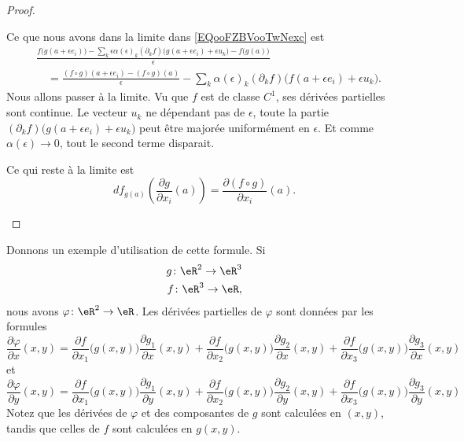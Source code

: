 \begin{proof}
\begin{subproof}
\begin{equation}
		\end{equation}
		Ce que nous avons dans la limite dans \eqref{EQooFZBVooTwNexc} est
		\begin{subequations}
			\begin{align}
				 & \frac{ f\big( g(a+\epsilon e_i)\big)-\sum_k\epsilon\alpha(\epsilon)_k (\partial_kf)\big( g(a+\epsilon e_i)+\epsilon u_k \big)-f\big( g(a) \big) }{ \epsilon } \\
				 & \quad=\frac{ (f\circ g)(a+\epsilon e_i)-(f\circ g)(a) }{ \epsilon }
				-\sum_k\alpha(\epsilon)_k(\partial_kf)\big( f(a+\epsilon e_i)+\epsilon u_k \big).
			\end{align}
		\end{subequations}
		Nous allons passer à la limite. Vu que \( f\) est de classe \( C^1\), ses dérivées partielles sont continue. Le vecteur \( u_k\) ne dépendant pas de \( \epsilon\), toute la partie \( (\partial_kf)\big( g(a+\epsilon e_i)+\epsilon u_k \big)\) peut être majorée uniformément en \( \epsilon\). Et comme \( \alpha(\epsilon)\to 0\), tout le second terme disparait.

		Ce qui reste à la limite est
		\begin{equation}
			df_{g(a)}\left( \frac{ \partial g }{ \partial x_i }(a) \right)=\frac{ \partial (f\circ g) }{ \partial x_i }(a).
		\end{equation}
	\end{subproof}
\end{proof}

Donnons un exemple d'utilisation de cette formule. Si
\begin{equation}
	\begin{aligned}[]
		g\colon \eR^2\to \eR^3 \\
		f\colon \eR^3\to \eR,
	\end{aligned}
\end{equation}
nous avons \( \varphi\colon \eR^2\to \eR\). Les dérivées partielles de \( \varphi\) sont données par les formules
\begin{equation}
	\frac{ \partial \varphi }{ \partial x }(x,y)=
	\frac{ \partial f }{ \partial x_1 }\big( g(x,y) \big)\frac{ \partial g_1 }{ \partial x }(x,y)
	+\frac{ \partial f }{ \partial x_2 }\big( g(x,y) \big)\frac{ \partial g_2 }{ \partial x }(x,y)
	+\frac{ \partial f }{ \partial x_3 }\big( g(x,y) \big)\frac{ \partial g_3 }{ \partial x }(x,y)
\end{equation}
et
\begin{equation}
	\frac{ \partial \varphi }{ \partial y }(x,y)=\frac{ \partial f }{ \partial x_1 }\big( g(x,y) \big)\frac{ \partial g_1 }{ \partial y }(x,y)+\frac{ \partial f }{ \partial x_2 }\big( g(x,y) \big)\frac{ \partial g_2 }{ \partial y }(x,y)+\frac{ \partial f }{ \partial x_3 }\big( g(x,y) \big)\frac{ \partial g_3 }{ \partial y }(x,y)
\end{equation}
Notez que les dérivées de \( \varphi\) et des composantes de \( g\) sont calculées en \( (x,y)\), tandis que celles de \( f\) sont calculées en \( g(x,y)\).

